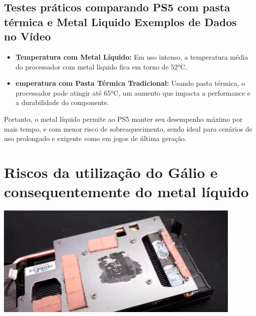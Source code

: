 \documentclass{article}
\begin{document}
\subsection{Testes práticos comparando PS5 com pasta térmica e Metal Liquido
Exemplos de Dados no Vídeo}
\begin{itemize}
    \item \textbf{Temperatura com Metal Líquido: } Em uso intenso, a temperatura média do processador com metal líquido fica em torno de 52°C.
    \item \textbf{emperatura com Pasta Térmica Tradicional: } Usando pasta térmica, o processador pode atingir até 65°C, um aumento que impacta a performance e a durabilidade do componente.
\end{itemize}
Portanto, o metal líquido permite ao PS5 manter seu desempenho máximo por mais tempo, e com menor risco de sobreaquecimento, sendo ideal para cenários de uso prolongado e exigente como em jogos de última geração.
\section{Riscos da utilização do Gálio e consequentemente do metal líquido}
\begin{adjustbox}{center,caption={Dissipador de calor que utiliza metal liquido},nofloat=figure,vspace=\bigskipamount}
    \centering
    \includegraphics[width=12cm]{heatspreader.png}
\end{adjustbox}
\end{document}
